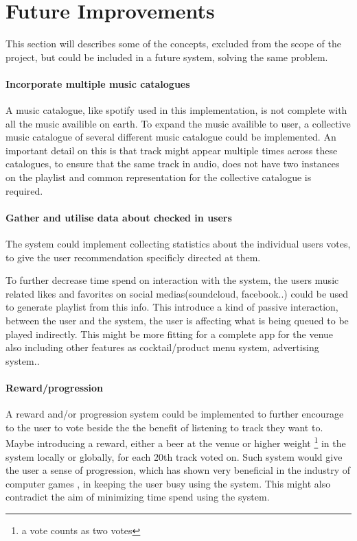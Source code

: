 \section{Future Improvements}
\label{future}

This section will describes some of the concepts, excluded from the scope of the project, but could be included in a future system, solving the same problem. 

\paragraph{Incorporate multiple music catalogues}
A music catalogue, like spotify used in this implementation, is not complete with all the music availible on earth. To expand the music availible to user, a collective music catalogue of several different music catalogue could be implemented. An important detail on this is that track might appear multiple times across these catalogues, to ensure that the same track in audio, does not have two instances on the playlist and common representation for the collective catalogue is required.

\paragraph{Gather and utilise data about checked in users}
The system could implement collecting statistics about the individual users votes, to give the user recommendation specificly directed at them.

To further decrease time spend on interaction with the system, the users music related likes and favorites on social medias(soundcloud, facebook..) could be used to generate playlist from this info. This introduce a kind of passive interaction, between the user and the system, the user is affecting what is being queued to be played indirectly. This might be more fitting for a complete app for the venue also including other features as cocktail/product menu system, advertising system..

\paragraph{Reward/progression}
A reward and/or progression system could be implemented to further encourage to the user to vote beside the the benefit of listening to track they want to. Maybe introducing a reward, either a beer at the venue or higher weight \footnote{a vote counts as two votes} in the system locally or globally, for each 20th track voted on. Such system would give the user a sense of progression, which has shown very beneficial in the industry of computer games \cite{games}, in keeping the user busy using the system. This might also contradict the aim of minimizing time spend using the system.